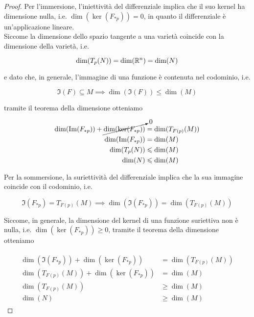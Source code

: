 \begin{proof}
	Per l'immersione, l'iniettività del differenziale implica che il suo kernel ha dimensione nulla, i.e. $ \dim(\ker(F_{*p})) = 0 $, in quanto il differenziale è un'applicazione lineare. \\
	Siccome la dimensione dello spazio tangente a una varietà coincide con la dimensione della varietà, i.e.
	
	\begin{equation}
		\dim(T_{p}(N)) = \dim(\mathbb{R}^{n}) = \dim(N)
	\end{equation}

	e dato che, in generale, l'immagine di una funzione è contenuta nel codominio, i.e.
	
	\begin{equation}
		\Im(F) \subseteq M %
		\implies %
		\dim(\Im(F)) \leqslant \dim(M)
	\end{equation}
	
	tramite il teorema della dimensione otteniamo
	
	\begin{align}
		\begin{split}
			\dim(\Im(F_{*p})) + \cancelto{0}{ \dim(\ker(F_{*p})) } &= \dim(T_{F(p)}(M)) \\
			\dim(\Im(F_{*p})) &= \dim(M) \\
			\dim(T_{p}(N)) &\leqslant \dim(M) \\
			\dim(N) &\leqslant \dim(M)
		\end{split}
	\end{align}

	Per la sommersione, la suriettività del differenziale implica che la sua immagine coincide con il codominio, i.e.
	
	\begin{equation}
		\Im(F_{*p}) = T_{F(p)}(M) %
		\implies %
		\dim(\Im(F_{*p})) = \dim(T_{F(p)}(M))
	\end{equation}

	Siccome, in generale, la dimensione del kernel di una funzione suriettiva non è nulla, i.e. $ \dim(\ker(F_{*p})) \geqslant 0 $, tramite il teorema della dimensione otteniamo
	
	\begin{align}
		\begin{split}
			\dim(\Im(F_{*p})) + \dim(\ker(F_{*p})) &= \dim(T_{F(p)}(M)) \\
			\dim(T_{F(p)}(M)) + \dim(\ker(F_{*p})) &= \dim(M) \\
			\dim(T_{F(p)}(M)) &\geqslant \dim(M) \\
			\dim(N) &\geqslant \dim(M)
		\end{split}
	\end{align}
\end{proof}

